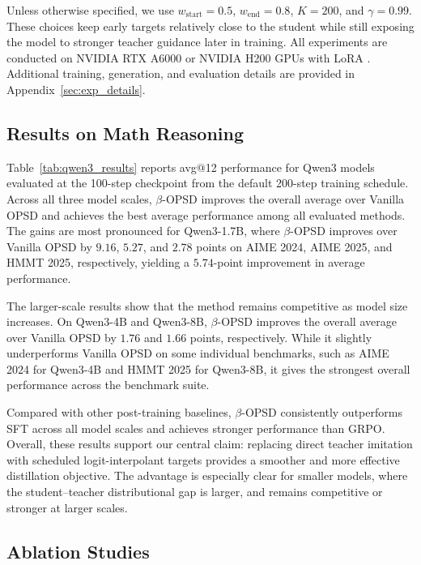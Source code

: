 Unless otherwise specified, we use $w_{\mathrm{start}}=0.5$,
$w_{\mathrm{end}}=0.8$, $K=200$, and $\gamma=0.99$. These choices keep early targets
relatively close to the student while still exposing the model to stronger teacher guidance
later in training. All experiments are conducted on NVIDIA RTX A6000 or NVIDIA H200
GPUs with LoRA \citep{hu2022lora}. Additional training, generation, and evaluation details
are provided in Appendix~\ref{sec:exp_details}.




\subsection{Results on Math Reasoning}
\label{sec:math_results}

Table~\ref{tab:qwen3_results} reports avg@12 performance for Qwen3 models evaluated
at the 100-step checkpoint from the default 200-step training schedule. Across all three
model scales, $\beta$-OPSD improves the overall average over Vanilla OPSD and achieves
the best average performance among all evaluated methods. The gains are most pronounced
for Qwen3-1.7B, where $\beta$-OPSD improves over Vanilla OPSD by $9.16$, $5.27$,
and $2.78$ points on AIME 2024, AIME 2025, and HMMT 2025, respectively, yielding a
$5.74$-point improvement in average performance.

The larger-scale results show that the method remains competitive as model size increases.
On Qwen3-4B and Qwen3-8B,
$\beta$-OPSD improves the overall average over Vanilla OPSD by $1.76$ and $1.66$
points, respectively. While it slightly underperforms Vanilla OPSD on some individual
benchmarks, such as AIME 2024 for Qwen3-4B and HMMT 2025 for Qwen3-8B, it gives
the strongest overall performance across the benchmark suite.

Compared with other post-training baselines, $\beta$-OPSD consistently outperforms SFT
across all model scales and achieves stronger performance than GRPO. Overall, these results support our central claim: replacing direct teacher imitation with
scheduled logit-interpolant targets provides a smoother and more effective distillation
objective. The advantage is especially clear for smaller models, where the student--teacher
distributional gap is larger, and remains competitive or stronger at larger
scales.

\subsection{Ablation Studies}
\label{sec:ablation_studies}

